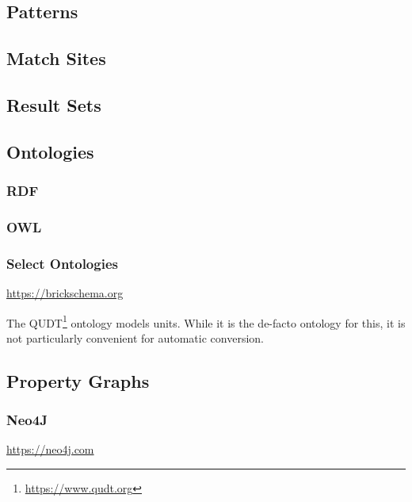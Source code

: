 \subsection{Patterns}



\subsection{Match Sites}



\subsection{Result Sets}



\subsection{Ontologies}
\subsubsection{RDF}
\subsubsection{OWL}
\subsubsection{Select Ontologies}

\url{https://brickschema.org}



The QUDT\footnote{\url{https://www.qudt.org}} ontology models units. While it is the de-facto ontology for this, it is not particularly convenient for automatic conversion.

\subsection{Property Graphs}
\subsubsection{Neo4J}

\url{https://neo4j.com}

